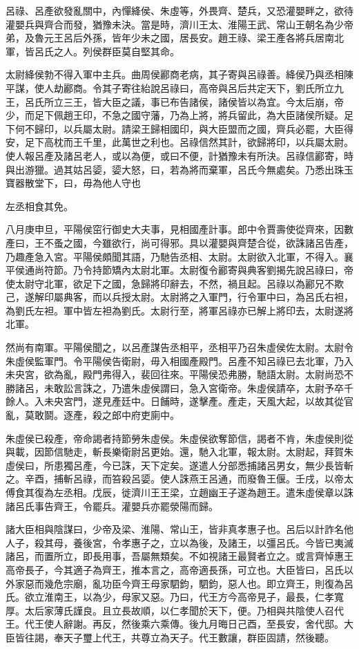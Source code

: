呂祿、呂產欲發亂關中，內憚絳侯、朱虛等，外畏齊、楚兵，又恐灌嬰畔之，欲待灌嬰兵與齊合而發，猶豫未決。當是時，濟川王太、淮陽王武、常山王朝名為少帝弟，及魯元王呂后外孫，皆年少未之國，居長安。趙王祿、梁王產各將兵居南北軍，皆呂氏之人。列侯群臣莫自堅其命。

太尉絳侯勃不得入軍中主兵。曲周侯酈商老病，其子寄與呂祿善。絳侯乃與丞相陳平謀，使人劫酈商。令其子寄往紿說呂祿曰，高帝與呂后共定天下，劉氏所立九王，呂氏所立三王，皆大臣之議，事已布告諸侯，諸侯皆以為宜。今太后崩，帝少，而足下佩趙王印，不急之國守藩，乃為上將，將兵留此，為大臣諸侯所疑。足下何不歸印，以兵屬太尉。請梁王歸相國印，與大臣盟而之國，齊兵必罷，大臣得安，足下高枕而王千里，此萬世之利也。呂祿信然其計，欲歸將印，以兵屬太尉。使人報呂產及諸呂老人，或以為便，或曰不便，計猶豫未有所決。呂祿信酈寄，時與出游獵。過其姑呂媭，媭大怒，曰，若為將而棄軍，呂氏今無處矣。乃悉出珠玉寶器散堂下，曰，毋為他人守也

左丞相食其免。

八月庚申旦，平陽侯窋行御史大夫事，見相國產計事。郎中令賈壽使從齊來，因數產曰，王不蚤之國，今雖欲行，尚可得邪。具以灌嬰與齊楚合從，欲誅諸呂告產，乃趣產急入宮。平陽侯頗聞其語，乃馳告丞相、太尉。太尉欲入北軍，不得入。襄平侯通尚符節。乃令持節矯內太尉北軍。太尉復令酈寄與典客劉揭先說呂祿曰，帝使太尉守北軍，欲足下之國，急歸將印辭去，不然，禍且起。呂祿以為酈兄不欺己，遂解印屬典客，而以兵授太尉。太尉將之入軍門，行令軍中曰，為呂氏右袒，為劉氏左袒。軍中皆左袒為劉氏。太尉行至，將軍呂祿亦已解上將印去，太尉遂將北軍。

然尚有南軍。平陽侯聞之，以呂產謀告丞相平，丞相平乃召朱虛侯佐太尉。太尉令朱虛侯監軍門。令平陽侯告衛尉，毋入相國產殿門。呂產不知呂祿已去北軍，乃入未央宮，欲為亂，殿門弗得入，裴回往來。平陽侯恐弗勝，馳語太尉。太尉尚恐不勝諸呂，未敢訟言誅之，乃遣朱虛侯謂曰，急入宮衛帝。朱虛侯請卒，太尉予卒千餘人。入未央宮門，遂見產廷中。日餔時，遂擊產。產走，天風大起，以故其從官亂，莫敢鬬。逐產，殺之郎中府吏廁中。

朱虛侯已殺產，帝命謁者持節勞朱虛侯。朱虛侯欲奪節信，謁者不肯，朱虛侯則從與載，因節信馳走，斬長樂衛尉呂更始。還，馳入北軍，報太尉。太尉起，拜賀朱虛侯曰，所患獨呂產，今已誅，天下定矣。遂遣人分部悉捕諸呂男女，無少長皆斬之。辛酉，捕斬呂祿，而笞殺呂媭。使人誅燕王呂通，而廢魯王偃。壬戌，以帝太傅食其復為左丞相。戊辰，徙濟川王王梁，立趙幽王子遂為趙王。遣朱虛侯章以誅諸呂氏事告齊王，令罷兵。灌嬰兵亦罷滎陽而歸。

諸大臣相與陰謀曰，少帝及梁、淮陽、常山王，皆非真孝惠子也。呂后以計詐名他人子，殺其母，養後宮，令孝惠子之，立以為後，及諸王，以彊呂氏。今皆已夷滅諸呂，而置所立，即長用事，吾屬無類矣。不如視諸王最賢者立之。或言齊悼惠王高帝長子，今其適子為齊王，推本言之，高帝適長孫，可立也。大臣皆曰，呂氏以外家惡而幾危宗廟，亂功臣今齊王母家駟鈞，駟鈞，惡人也。即立齊王，則復為呂氏。欲立淮南王，以為少，母家又惡。乃曰，代王方今高帝見子，最長，仁孝寬厚。太后家薄氏謹良。且立長故順，以仁孝聞於天下，便。乃相與共陰使人召代王。代王使人辭謝。再反，然後乘六乘傳。後九月晦日己酉，至長安，舍代邸。大臣皆往謁，奉天子璽上代王，共尊立為天子。代王數讓，群臣固請，然後聽。

